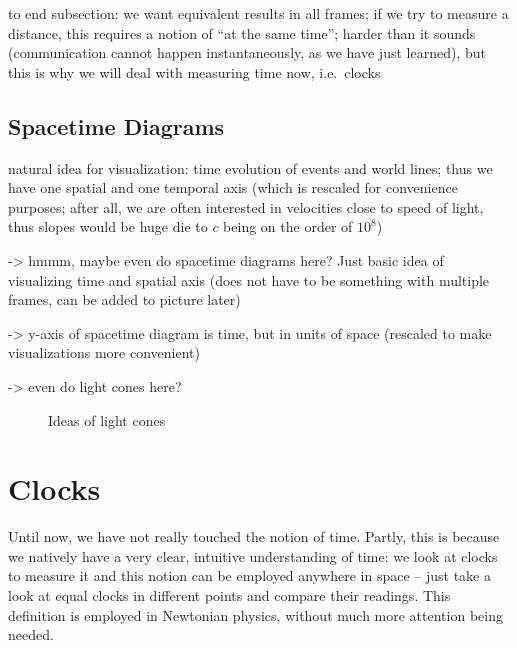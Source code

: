 to end subsection: we want equivalent results in all frames; if we try to measure a distance, this requires a notion of \enquote{at the same time}; harder than it sounds (communication cannot happen instantaneously, as we have just learned), but this is why we will deal with measuring time now, i.e.~clocks



		\subsection{Spacetime Diagrams}
natural idea for visualization: time evolution of events and world lines; thus we have one spatial and one temporal axis (which is rescaled for convenience purposes; after all, we are often interested in velocities close to speed of light, thus slopes would be huge die to $c$ being on the order of $10^8$)

-> hmmm, maybe even do spacetime diagrams here? Just basic idea of visualizing time and spatial axis (does not have to be something with multiple frames, can be added to picture later)

-> y-axis of spacetime diagram is time, but in units of space (rescaled to make visualizations more convenient)


-> even do light cones here?


\begin{figure}
\centering


\caption{Ideas of light cones}
\end{figure}



\newpage



	\section{Clocks}%
Until now, we have not really touched the notion of time. Partly, this is because we natively have a very clear, intuitive understanding of time: we look at clocks to measure it and this notion can be employed anywhere in space -- just take a look at equal clocks in different points and compare their readings. This definition is employed in Newtonian physics, without much more attention being needed.


